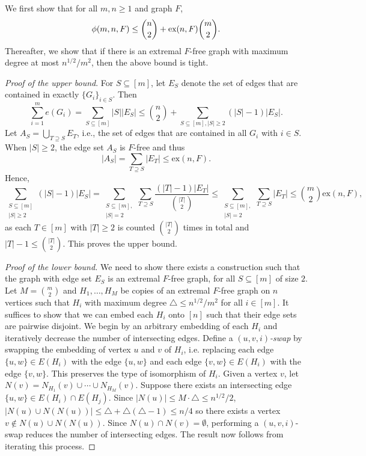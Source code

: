 \documentclass[12pt]{article}
\newcommand*{\ex}{\textnormal{ex}}
\begin{document}
We first show that for all 
$m,n \geq 1$ and graph $F$, 
\[  
  \phi(m, n ,F) \leq \binom{n}{2} + \ex(n, F)\binom{m}{2}.  
\]
Thereafter, we show that if there is an extremal $F$-free graph with maximum degree at most $n^{1/2}/m^2$, then the above bound is tight. 

\textit{Proof of the upper bound}. For $S \subseteq [m]$, let $E_S$ denote the set of edges that are contained in exactly $\{G_i\}_{i \in S}$. Then 
\[
  \sum_{i = 1}^m e(G_i) = \sum_{S \subseteq [m]} |S||E_S| \leq \binom{n}{2} + \sum_{S \subseteq [m], |S| \geq 2} (|S| - 1)|E_S|.
\]
Let $A_S = \bigcup_{T \supseteq S} E_T$, i.e., the set of edges that are contained in all $G_i$ with $i \in S$. When $|S| \geq 2$, the edge set $A_S$ is $F$-free and thus 
\[
  |A_S| = \sum_{T \supseteq S} |E_T| \leq \text{ex}(n, F).
\]
Hence,
\[
  \sum_{\substack{S \subseteq [m] \\ |S| \geq 2}} (|S| - 1)|E_S| = \sum_{\substack{S \subseteq [m], \\ |S| = 2}} \sum_{T \supseteq S} \frac{(|T| - 1)|E_T|}{\binom{|T|}{2}} \leq \sum_{\substack{S \subseteq [m], \\ |S| = 2}} \sum_{T \supseteq S} |E_T| \leq \binom{m}{2}\text{ex}(n, F),
\]
as each $T \in [m]$ with $|T| \geq 2$ is counted $\binom{|T|}{2}$ times in total and $|T| - 1 \leq \binom{|T|}{2}$. This proves the upper bound.

\begin{proof}[Proof of the lower bound]
  We need to show there exists a construction such that the graph with edge set $E_S$ is an extremal $F$-free graph, for all $S \subseteq [m]$ of size $2$. Let $M = \binom{m}{2}$ and $H_1, \ldots, H_M$ be copies of an extremal $F$-free graph on $n$ vertices such that $H_i$ with maximum degree $\triangle \leq n^{1/2}/m^2$ for all $i \in [m]$. It suffices to show that we can embed each $H_i$ onto $[n]$ such that their edge sets are pairwise disjoint. We begin by an arbitrary embedding of each $H_i$ and iteratively decrease the number of intersecting edges. Define a \textit{$(u, v, i)$-swap} by swapping the embedding of vertex $u$ and $v$ of $H_i$, i.e. replacing each edge $\{u, w\} \in E(H_i)$ with the edge $\{u, w\}$ and each edge $\{v, w\} \in E(H_i)$ with the edge $\{v, w\}$. This preserves the type of isomorphism of $H_i$. Given a vertex $v$, let $N(v) = N_{H_1}(v) \cup \cdots \cup N_{H_M}(v)$. Suppose there exists an intersecting edge $\{u, w\} \in E(H_i) \cap E(H_j)$. Since $|N(u)| \leq M \cdot \triangle \leq n^{1/2}/2$, $|N(u) \cup N(N(u))| \leq \triangle + \triangle(\triangle - 1) \leq n/4$ so there exists a vertex $v \notin N(u) \cup N(N(u))$. Since $N(u) \cap N(v) = \emptyset$, performing a $(u, v, i)$-swap reduces the number of intersecting edges. The result now follows from iterating this process.
\end{proof}
\end{document}
